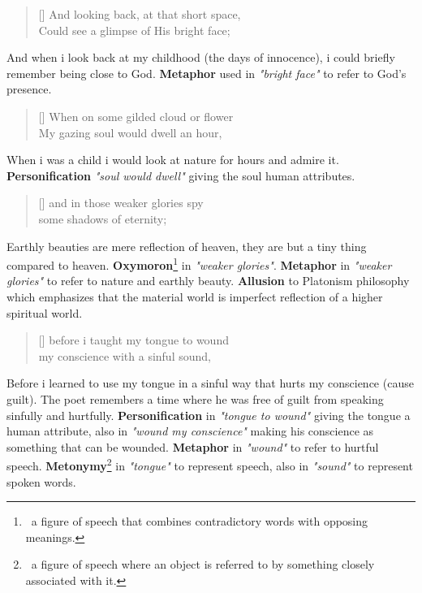 \documentclass[12pt, a4paper]{article}
\begin{document}
\begin{verse}[\versewidth]
{\fontverse
And looking back, at that short space,\\
Could see a glimpse of His bright face;
} 
\end{verse}

And when i look back at my childhood (the days of innocence), i could
briefly remember being close to God. \textbf{Metaphor} used in \textit{"bright face"} 
to refer to God's presence. 

\begin{verse}[\versewidth]
{\fontverse
When on some gilded cloud or flower\\
My gazing soul would dwell an hour, 
} 
\end{verse}

When i was a child i would look at nature for hours and admire it.
\textbf{Personification} \textit{"soul would dwell"} giving the soul
human attributes. 


\begin{verse}[\versewidth]
{\fontverse
and in those weaker glories spy\\
some shadows of eternity;
} 
\end{verse}

Earthly beauties are mere reflection of heaven, they are 
but a tiny thing compared to heaven. \textbf{Oxymoron}\footnote{
\, a figure of speech that combines contradictory words with opposing meanings.}
in \textit{"weaker glories"}.
\textbf{Metaphor} in \textit{"weaker glories"} to refer to nature and earthly beauty. 
\textbf{Allusion} to Platonism philosophy which emphasizes that the material world is imperfect 
reflection of a higher spiritual world.

\begin{verse}[\versewidth]
{\fontverse
before i taught my tongue to wound\\
my conscience with a sinful sound, 
} 
\end{verse}

Before i learned to use my tongue in a sinful way that hurts
my conscience (cause guilt). The poet remembers a time where he was free of guilt 
from speaking sinfully and hurtfully. \textbf{Personification} in \textit{"tongue to wound"}
giving the tongue a human attribute, also in \textit{"wound my conscience"} making 
his conscience as something that can be wounded. \textbf{Metaphor} in \textit{"wound"} to refer
to hurtful speech. \textbf{Metonymy}\footnote{\, a figure of speech where an object 
is referred to by something closely associated with it.}
in \textit{"tongue"} to represent speech, also in \textit{"sound"} to represent spoken words.
\end{document}
